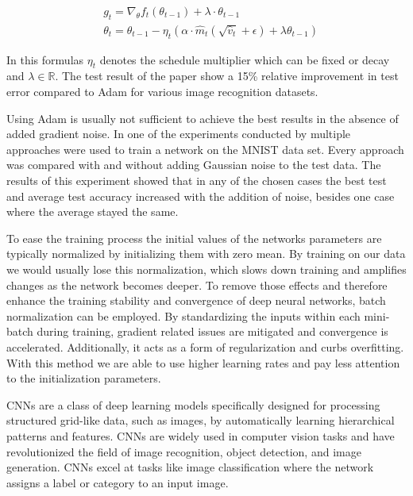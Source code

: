 \documentclass[
a4paper, 
12pt,
grayscalebody, %
abstract=on,
twoside, BCOR10mm, 12pt, DIV13,headinclude, footexclude, final, abstracton, openright
]{ibireprt}
\numberwithin{equation}{chapter}
\numberwithin{table}{chapter}
\numberwithin{figure}{chapter}
\numberwithin{algorithm}{chapter}
\numberwithin{example}{chapter}
\numberwithin{example}{chapter}
\begin{document}
\begin{align}
		&g_t  = \nabla_\theta f_t(\theta_{t-1})+\lambda\cdot\theta_{t-1}\\
		&\theta_t = \theta_{t-1}-\eta_t (\alpha\cdot\hat{m}_t(\sqrt{\hat{v}_t}+\epsilon)+\lambda\theta_{t-1})
\end{align}  

In this formulas $\eta_t$ denotes the schedule multiplier which can be fixed or decay and $\lambda \in \mathbb{R}$. The test result of the paper show a 15\% relative improvement in test error compared to Adam for various image recognition datasets.

 
Using Adam is usually not sufficient to achieve the best results in the absence of added gradient noise. In one of the experiments conducted by \cite{Neelakantan2015} multiple approaches were used to train a network on the MNIST data set. Every approach was compared with and without adding Gaussian noise to the test data. The results of this experiment showed that in any of the chosen cases the best test and average test accuracy increased with the addition of noise, besides one case where the average stayed the same. 



To ease the training process the initial values of the networks parameters are typically normalized by initializing them with zero mean. By training on our data we would usually lose this normalization, which slows down training and amplifies changes as the network becomes deeper. To remove those effects and therefore enhance the training stability and convergence of deep neural networks, batch normalization can be employed. \cite{Ioffe2015} By standardizing the inputs within each mini-batch during training, gradient related issues are mitigated and convergence is  accelerated. Additionally, it acts as a form of regularization and curbs overfitting. With this method we are able to use higher learning rates and pay less attention to the initialization parameters. \cite{Ruder2016} 



CNNs are a class of deep learning models specifically designed for processing structured grid-like data, such as images, by automatically learning hierarchical patterns and features. CNNs are widely used in computer vision tasks and have revolutionized the field of image recognition, object detection, and image generation. CNNs excel at tasks like image classification where the network assigns a label or category to an input image.
\end{document}

